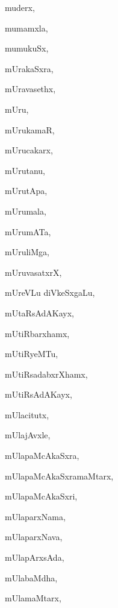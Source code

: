 \begin{multicols}{3}
{\noindent
{muderx}, \pageref{muderx}

\noindent
{mumamxla}, \pageref{mumamxla}

\noindent
{mumukuSx}, \pageref{mumukuSx}

\noindent
{mUrakaSxra}, \pageref{mUrakaSxra}

\noindent
{mUravasethx}, \pageref{mUravasethx}

\noindent
{mUru}, \pageref{mUru}

\noindent
{mUrukamaR}, \pageref{mUrukamaR}

\noindent
{mUrucakarx}, \pageref{mUrucakarx}

\noindent
{mUrutanu}, \pageref{mUrutanu}

\noindent
{mUrutApa}, \pageref{mUrutApa}

\noindent
{mUrumala}, \pageref{mUrumala}

\noindent
{mUrumATa}, \pageref{mUrumATa}

\noindent
{mUruliMga}, \pageref{mUruliMga}

\noindent
{mUruvasatxrX}, \pageref{mUruvasatxrX}

\noindent
{mUreVLu diVkeSx\-gaLu}, \pageref{mUreVLu diVkeSxgaLu}

\noindent
{mUtaRsAdAKayx}, \pageref{mUtaRsAdAKayx}

\noindent
{mUtiRbarxhamx}, \pageref{mUtiRbarxhamx}

\noindent
{mUtiRyeMTu}, \pageref{mUtiRyeMTu}

\noindent
{mUtiRsadabxrXhamx}, \pageref{mUtiRsadabxrXhamx}

\noindent
{mUtiRsAdAKayx}, \pageref{mUtiRsAdAKayx}

\noindent
{mUlacitutx}, \pageref{mUlacitutx}

\noindent
{mUlajAvxle}, \pageref{mUlajAvxle}

\noindent
{mUlapaMcAkaSxra}, \pageref{mUlapaMcAkaSxra}

\noindent
{mUlapaMcAkaSxramaMtarx}, \pageref{mUlapaMcAkaSxramaMtarx}

\noindent
{mUlapaMcAkaSxri}, \pageref{mUlapaMcAkaSxri}

\noindent
{mUlaparxNama}, \pageref{mUlaparxNama}

\noindent
{mUlaparxNava}, \pageref{mUlaparxNava}

\noindent
{mUlapArxsAda}, \pageref{mUlapArxsAda}

\noindent
{mUlabaMdha}, \pageref{mUlabaMdha}

\noindent
{mUlamaMtarx}, \pageref{mUlamaMtarx}

}
\end{multicols}
